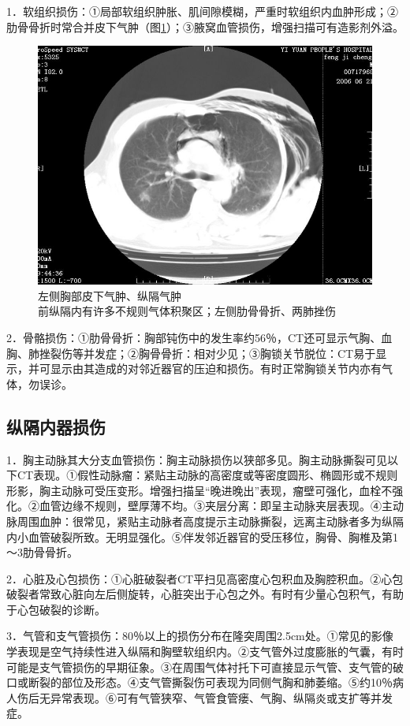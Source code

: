 1．软组织损伤：①局部软组织肿胀、肌间隙模糊，严重时软组织内血肿形成；②肋骨骨折时常合并皮下气肿（图\ref{fig9-32}）；③腋窝血管损伤，增强扫描可有造影剂外溢。

\begin{figure}[!htbp]
 \centering
 \includegraphics[width=.7\textwidth,height=\textheight,keepaspectratio]{./images/Image00223.jpg}
 \captionsetup{justification=centering}
 \caption{左侧胸部皮下气肿、纵隔气肿\\{\small 前纵隔内有许多不规则气体积聚区；左侧肋骨骨折、两肺挫伤}}
 \label{fig9-32}
  \end{figure} 

2．骨骼损伤：①肋骨骨折：胸部钝伤中的发生率约56％，CT还可显示气胸、血胸、肺挫裂伤等并发症；②胸骨骨折：相对少见；③胸锁关节脱位：CT易于显示，并可显示由其造成的对邻近器官的压迫和损伤。有时正常胸锁关节内亦有气体，勿误诊。

\subsection{纵隔内器损伤}

1．胸主动脉其大分支血管损伤：胸主动脉损伤以狭部多见。胸主动脉撕裂可见以下CT表现。①假性动脉瘤：紧贴主动脉的高密度或等密度圆形、椭圆形或不规则形影，胸主动脉可受压变形。增强扫描呈“晚进晚出”表现，瘤壁可强化，血栓不强化。②血管边缘不规则，壁厚薄不均。③夹层分离：即呈主动脉夹层表现。④主动脉周围血肿：很常见，紧贴主动脉者高度提示主动脉撕裂，远离主动脉者多为纵隔内小血管破裂所致。无明显强化。⑤伴发邻近器官的受压移位，胸骨、胸椎及第1～3肋骨骨折。

2．心脏及心包损伤：①心脏破裂者CT平扫见高密度心包积血及胸腔积血。②心包破裂者常致心脏向左后侧旋转，心脏突出于心包之外。有时有少量心包积气，有助于心包破裂的诊断。

3．气管和支气管损伤：80％以上的损伤分布在隆突周围2.5cm处。①常见的影像学表现是空气持续性进入纵隔和胸壁软组织内。②支气管外过度膨胀的气囊，有时可能是支气管损伤的早期征象。③在周围气体衬托下可直接显示气管、支气管的破口或断裂的部位及形态。④支气管撕裂伤可表现为同侧气胸和肺萎缩。⑤约10％病人伤后无异常表现。⑥可有气管狭窄、气管食管瘘、气胸、纵隔炎或支扩等并发症。

